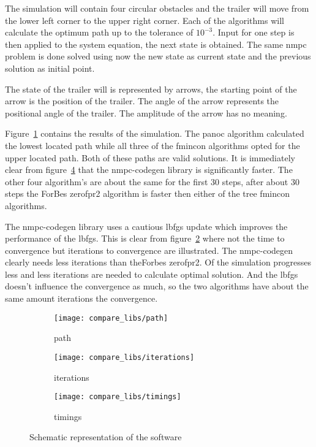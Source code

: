 The simulation will contain four circular obstacles and the trailer will move from the lower left corner to the upper right corner. Each of the algorithms will calculate the optimum path up to the tolerance of $10^{-3}$. Input for one step is then applied to the system equation, the next state is obtained. The same nmpc problem is done solved using now the new state as current state  and the previous solution as initial point.

The state of the trailer will is represented by arrows, the starting point of the arrow is the position of the trailer. The angle of the arrow represents the positional angle of the trailer. The amplitude of the arrow has no meaning.

Figure~\ref{fig:solution path trailer example} contains the results of the simulation. The panoc algorithm calculated the lowest located path while all three of the fmincon algorithms opted for the upper located path. Both of these paths are valid solutions. It is immediately clear from figure~\ref{fig:timings trailer example} that the nmpc-codegen library is significantly faster. The other four algorithm's are about the same for the first 30 steps, after about 30 steps the ForBes zerofpr2 algorithm is faster then either of the tree fmincon algorithms.

The nmpc-codegen library uses a cautious lbfgs update which improves the performance of the lbfgs. This is clear from figure~\ref{fig:iterations trailer example} where not the time to convergence but iterations to convergence are illustrated. The nmpc-codegen clearly needs less iterations than theForbes zerofpr2. Of the simulation progresses less and less iterations are needed to calculate optimal solution. And the lbfgs doesn't influence the convergence as much, so the two algorithms have about the same amount iterations the convergence.
\begin{figure}[H]
	\centering
	\begin{subfigure}[b]{0.45\textwidth}
		\centering
		\texttt{[image: compare\_libs/path]}
		\caption{path}
		\label{fig:solution path trailer example}
	\end{subfigure}
	
	\begin{subfigure}[b]{0.45\textwidth}
		\centering
		\texttt{[image: compare\_libs/iterations]}
		\caption{iterations}
		\label{fig:iterations trailer example}
	\end{subfigure}
	\hfill
	\begin{subfigure}[b]{0.45\textwidth}
		\centering
		\texttt{[image: compare\_libs/timings]}
		\caption{timings}
		\label{fig:timings trailer example}
	\end{subfigure}
	\caption{Schematic representation of the software}
\end{figure}

